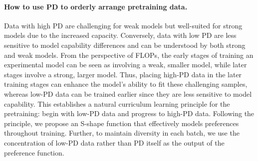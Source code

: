 \documentclass[11pt]{article}
\begin{document}
\paragraph{How to use PD to orderly arrange pretraining data.} 
Data with high PD are challenging for weak models but well-suited for strong models due to the increased capacity. Conversely, data with low PD are less sensitive to model capability differences and can be understood by both strong and weak models. From the perspective of FLOPs, the early stages of training an experimental model can be seen as involving a weak, smaller model, while later stages involve a strong, larger model. Thus, placing high-PD data in the later training stages can enhance the model's ability to fit these challenging samples, whereas low-PD data can be trained earlier since they are less sensitive to model capability. This establishes a natural curriculum learning principle for the pretraining: begin with low-PD data and progress to high-PD data.  Following the principle, we propose an S-shape function that effectively models preferences throughout training. Further, to maintain diversity in each batch, we use the concentration of low-PD data rather than PD itself as the output of the preference function.



\end{document}
